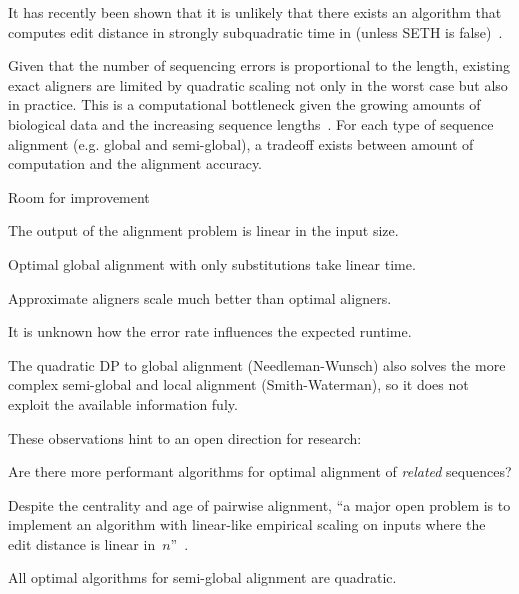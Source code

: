 It has recently been shown that it is unlikely that there exists an algorithm
that computes edit distance in strongly subquadratic time in (unless SETH is
false)~\citep{backurs2015edit}.

Given that the number of sequencing errors is proportional to the length,
existing exact aligners are limited by quadratic scaling not only in the worst
case but also in practice. This is a computational bottleneck given the growing
amounts of biological data and the increasing sequence
lengths~\citep{kucherov2019evolution}. For each type of sequence alignment (e.g.
global and semi-global), a tradeoff exists between amount of computation and the
alignment accuracy.

Room for improvement

\begin{observation}
    The output of the alignment problem is linear in the input size.
\end{observation}

\begin{observation}
    Optimal global alignment with only substitutions take linear time.
\end{observation}

\begin{observation}
    Approximate aligners scale much better than optimal aligners.
\end{observation}

It is unknown how the error rate influences the expected runtime.

\begin{observation}
    The quadratic DP to global alignment (Needleman-Wunsch) also solves the more
    complex semi-global and local alignment (Smith-Waterman), so it does not
    exploit the available information fuly.
\end{observation}

These observations hint to an open direction for research:

\begin{problem}
    Are there more performant algorithms for optimal alignment of \emph{related}
    sequences?
\end{problem}

Despite the centrality and age of pairwise alignment, ``a major open problem is
to implement an algorithm with linear-like empirical scaling on inputs where the
edit distance is linear in~$n$''~\citep{medvedev2022theoretical}.

\begin{observation}
    All optimal algorithms for semi-global alignment are quadratic.
\end{observation}

